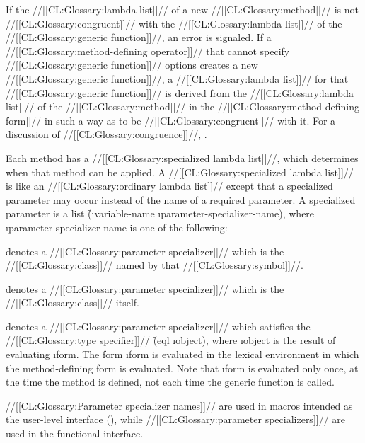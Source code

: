 If the //[[CL:Glossary:lambda list]]// of a new //[[CL:Glossary:method]]// is not
//[[CL:Glossary:congruent]]// with the //[[CL:Glossary:lambda list]]// of the //[[CL:Glossary:generic function]]//,
an error is signaled.  If a //[[CL:Glossary:method-defining operator]]// that cannot specify
//[[CL:Glossary:generic function]]// options creates a new //[[CL:Glossary:generic function]]//, 
a //[[CL:Glossary:lambda list]]// for that //[[CL:Glossary:generic function]]// is derived from the
//[[CL:Glossary:lambda list]]// of the //[[CL:Glossary:method]]// in the //[[CL:Glossary:method-defining form]]// in such a way
as to be //[[CL:Glossary:congruent]]// with it.  For a discussion of //[[CL:Glossary:congruence]]//,
\seesection\GFMethodLambdaListCongruency.

Each method has a //[[CL:Glossary:specialized lambda list]]//, which determines
when that method can be applied.  A //[[CL:Glossary:specialized lambda list]]// is like
an //[[CL:Glossary:ordinary lambda list]]// except that a specialized parameter
may occur instead of the name of a required parameter.  A specialized parameter
is a list \f{(\i{variable-name} \i{parameter-specializer-name})},
where \i{parameter-specializer-name} is one of the following:

\beginlist


denotes a //[[CL:Glossary:parameter specializer]]// which is the //[[CL:Glossary:class]]// 
named by that //[[CL:Glossary:symbol]]//.




denotes a //[[CL:Glossary:parameter specializer]]// which is the //[[CL:Glossary:class]]// itself.



denotes a //[[CL:Glossary:parameter specializer]]// which satisfies the //[[CL:Glossary:type specifier]]//
\f{(eql \i{object})}, where \i{object} is the 
result of evaluating \i{form}.  The form \i{form} is evaluated in 
the lexical environment in which the method-defining form is evaluated.
Note that \i{form} is evaluated only once, at the time the method is
defined, not each time the generic function is called.
\endlist

//[[CL:Glossary:Parameter specializer names]]// are used in macros intended as the
user-level interface (), while //[[CL:Glossary:parameter specializers]]//
are used in the functional interface.

